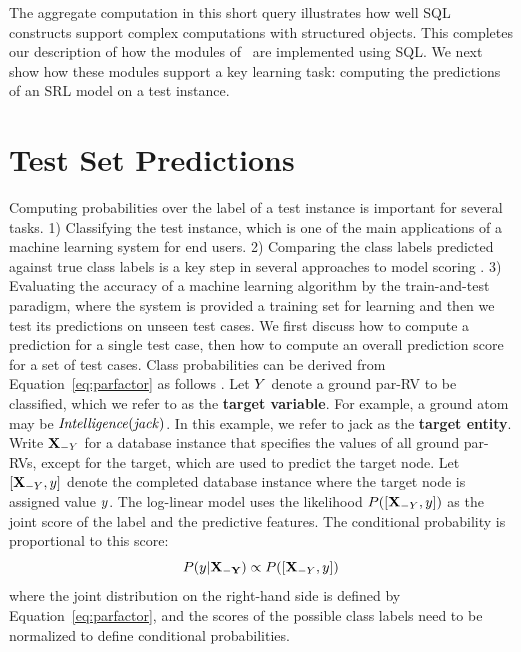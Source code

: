 The aggregate computation in this short query illustrates how well SQL constructs support complex computations with structured objects. This completes our description of how the modules of \FB\ are implemented using SQL. We next show how these modules support a key learning task: computing the predictions of an SRL model on a test instance. 

%




\section{Test Set Predictions} Computing probabilities over the label of a test instance is important for several tasks. 1) Classifying the test instance, which is one of the main applications of a machine learning system for end users. 2) Comparing the class labels predicted against true class labels is a key step in several approaches to model scoring \cite{Kimmig2015}. 3) Evaluating the accuracy of a machine learning algorithm by the train-and-test paradigm, where the system is provided a training set for learning and then we test its predictions on unseen test cases. %
%
We first discuss how to compute a prediction for a single test case, then how to compute an overall prediction score for a set of test cases. Class probabilities can be derived from Equation~\ref{eq:parfactor} as follows \cite[Sec.2.2.2]{Kimmig2015}. Let $Y$ denote a ground par-RV to be classified, which we refer to as the \textbf{target variable}. For example, a ground atom may be $\it{Intelligence}(jack)$. In this example, we refer to jack as the \textbf{target entity}. Write $\mathbf{X}_{-Y}$ for a database instance that specifies the values of all ground par-RVs, except for the target, which are used to predict the target node. Let $[\mathbf{X}_{-Y},y]$ denote the completed database instance where the target node is assigned value $y$. The log-linear model uses the likelihood $P([\mathbf{X}_{-Y},y])$ as the joint score of the label and the predictive features. The conditional probability is proportional to this score:
\begin{equation} \label{eq:classify}
P(y|\mathbf{X_{-Y}}) \propto P([\mathbf{X}_{-Y},y])
\end{equation}
where the joint distribution on the right-hand side is defined by Equation~\ref{eq:parfactor}, and the scores of the possible class labels need to be normalized to define  conditional probabilities. 


